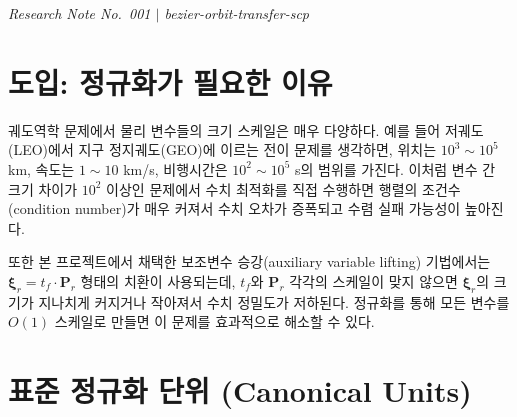 \documentclass[11pt]{article}
\begin{document}
\drawborder
\thispagestyle{firstpage}


{\normalsize\textit{Research Note No.~001 $|$ bezier-orbit-transfer-scp}}\par\medskip

\def\lighterdate{March 12, 2026}


\begin{abstract}
본 보고서는 베지어 곡선 기반 궤도전이 궤적최적화 문제에서 수치 안정성을 확보하기 위한
궤도역학 표준 정규화(canonical units) 이론을 정리한다.
위치, 속도, 시간의 물리적 스케일 차이가 수십 배 이상 차이 나는 궤도역학 문제에서
수치 최적화기(QP/SOCP solver)의 조건수(condition number)를 개선하고 수렴 안정성을 높이기 위해
표준 정규화를 도입한다.
LEO에서 GEO까지 모든 궤도 영역에 적용 가능한 적응형 정규화 체계를 함께 제시한다.
\end{abstract}

\section{도입: 정규화가 필요한 이유}

궤도역학 문제에서 물리 변수들의 크기 스케일은 매우 다양하다.
예를 들어 저궤도(LEO)에서 지구 정지궤도(GEO)에 이르는 전이 문제를 생각하면,
위치는 $10^3 \sim 10^5$ km, 속도는 $1 \sim 10$ km/s, 비행시간은 $10^2 \sim 10^5$ s의 범위를 가진다.
이처럼 변수 간 크기 차이가 $10^2$ 이상인 문제에서 수치 최적화를 직접 수행하면
행렬의 조건수(condition number)가 매우 커져서 수치 오차가 증폭되고 수렴 실패 가능성이 높아진다.

또한 본 프로젝트에서 채택한 보조변수 승강(auxiliary variable lifting) 기법에서는
$\boldsymbol{\xi}_r = t_f \cdot \mathbf{P}_r$ 형태의 치환이 사용되는데,
$t_f$와 $\mathbf{P}_r$ 각각의 스케일이 맞지 않으면 $\boldsymbol{\xi}_r$의 크기가 지나치게 커지거나
작아져서 수치 정밀도가 저하된다.
정규화를 통해 모든 변수를 $O(1)$ 스케일로 만들면 이 문제를 효과적으로 해소할 수 있다.

\section{표준 정규화 단위 (Canonical Units)}
\end{document}
